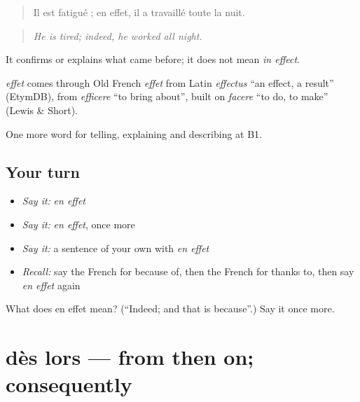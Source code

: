 \begin{quote}
Il est fatigué ; en effet, il a travaillé toute la nuit.
\end{quote}

\begin{quote}
\emph{He is tired; indeed, he worked all night.}
\end{quote}

It confirms or explains what came before; it does not mean \emph{in effect}.

\begin{cousinweb}
\emph{effet} comes through Old French \emph{effet} from Latin \emph{effectus} \textquotedblleft{}an effect, a result\textquotedblright{} (EtymDB), from \emph{efficere} \textquotedblleft{}to bring about\textquotedblright{}, built on \emph{facere} \textquotedblleft{}to do, to make\textquotedblright{} (Lewis \& Short).
\end{cousinweb}

\begin{grammarlens}[title={What you've built}]
One more word for telling, explaining and describing at B1.
\end{grammarlens}

\subsection*{Your turn}
\begin{itemize}
\raggedright
  \item \emph{Say it:} \emph{en effet}
  \item \emph{Say it:} \emph{en effet}, once more
  \item \emph{Say it:} a sentence of your own with \emph{en effet}
  \item \emph{Recall:} say the French for because of, then the French for thanks to, then say \emph{en effet} again
\end{itemize}

\begin{tcolorbox}[breakable,colback=teal!4,colframe=teal!35!black,title={Before you move on}]
What does en effet mean? (\textquotedblleft{}Indeed; and that is because\textquotedblright{}.) Say it once more.
\end{tcolorbox}
\section[dès lors]{dès lors — from then on; consequently}

\label{lesson:FR-C348-des-lors}



